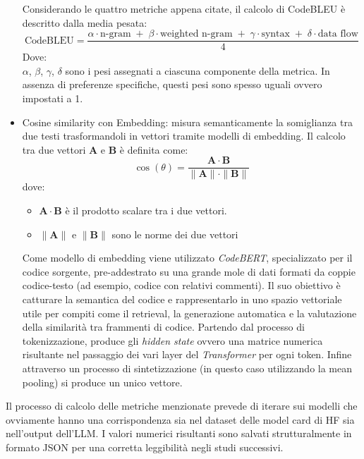 \documentclass{article}
\begin{document}
\begin{itemize}
\begin{itemize}
    \end{itemize}
    Considerando le quattro metriche appena citate, il calcolo di CodeBLEU è descritto dalla media pesata:
    \begin{equation} \label{codebleu}
        \text{CodeBLEU} = \frac{\alpha \cdot \text{n-gram} \;+\; \beta \cdot \text{weighted n-gram} \;+\; \gamma \cdot \text{syntax} \;+\; \delta \cdot \text{data flow}}{4}
    \end{equation}
    Dove:\\
    $\alpha$, $\beta$, $\gamma$, $\delta$ sono i pesi assegnati a ciascuna componente della metrica. In assenza di preferenze specifiche, questi pesi sono spesso uguali ovvero impostati a 1.  
    \item Cosine similarity con Embedding: misura semanticamente la somiglianza tra due testi trasformandoli in vettori tramite modelli di embedding. Il calcolo tra due vettori $\mathbf{A}$ e $\mathbf{B}$ è definita come:
    \begin{equation}
        \cos(\theta) = \frac{\mathbf{A} \cdot \mathbf{B}}{\|\mathbf{A}\| \cdot \|\mathbf{B}\|}
    \end{equation}
    dove:
    \begin{itemize}
        \item $\mathbf{A} \cdot \mathbf{B}$ è il prodotto scalare tra i due vettori.
        \item $\|\mathbf{A}\|$ e $\|\mathbf{B}\|$ sono le norme dei due vettori
    \end{itemize}
    Come modello di embedding viene utilizzato \textit{CodeBERT}\cite{feng2020codebertpretrainedmodelprogramming}, specializzato per il codice sorgente, pre-addestrato su una grande mole di dati formati da coppie codice-testo (ad esempio, codice con relativi commenti). Il suo obiettivo è catturare la semantica del codice e rappresentarlo in uno spazio vettoriale utile per compiti come il retrieval, la generazione automatica e la valutazione della similarità tra frammenti di codice. Partendo dal processo di tokenizzazione, produce gli \textit{hidden state} ovvero una matrice numerica risultante nel passaggio dei vari layer del \textit{Transformer} per ogni token. Infine attraverso un processo di sintetizzazione (in questo caso utilizzando la mean pooling) si produce un unico vettore. 
\end{itemize}
Il processo di calcolo delle metriche menzionate prevede di iterare sui modelli che ovviamente hanno una corrispondenza sia nel dataset delle model card di HF sia nell'output dell'LLM. I valori numerici risultanti sono salvati strutturalmente in formato JSON per una corretta leggibilità negli studi successivi.
\end{document}
